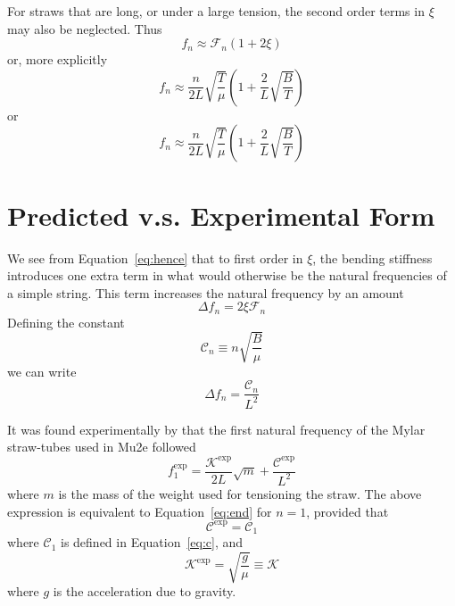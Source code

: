 \documentclass[twoside]{article}
\begin{document}
\begin{multicols}{2}
For straws that are long, or under a large tension, the second order terms in $\xi$ may also be neglected. Thus
 \begin{equation}
 \boxed{
 	f_n \approx \mathcal{F}_n (1 + 2\xi )
 }
 \end{equation}
 or, more explicitly 
  \begin{equation}
  f_n \approx  \frac{n}{2L}\sqrt{\frac{T}{\mu}}  (1 + \frac{2}{L}  \sqrt{\frac{B}{T}} )
 \label{eq:end}
  \end{equation}
or
  \begin{equation}
  f_n \approx  \frac{n}{2L}\sqrt{\frac{T}{\mu}}  (1 + \frac{2}{L}  \sqrt{\frac{B}{T}} )
  \end{equation}




\section{Predicted v.s. Experimental Form}
We see from Equation~\ref{eq:hence} that to first order in $\xi$, the bending stiffness introduces one extra term in what would otherwise be the natural frequencies of a simple string. This term increases the natural frequency by an amount
\begin{equation}
\Delta f_n =  2 \xi \mathcal{F}_n
\end{equation}
Defining the constant 
\begin{equation}
\mathcal{C}_n \equiv n \sqrt{\frac{B}{\mu}}
\label{eq:c}
\end{equation}
we can write
\begin{equation}
\Delta f_n =  \frac{\mathcal{C}_n}{L^2}
\end{equation}


It was found experimentally by \cite{david} that the first natural frequency of the Mylar straw-tubes used in Mu2e followed 
\begin{equation}
\boxed{
	f^\text{exp}_1 = \frac{\mathcal{K}^\text{exp}}{2L}\sqrt{m} + \frac{\mathcal{C}^\text{exp}}{L^2}
}
\end{equation}
where $m$ is the mass of the weight used for tensioning the straw.  The above expression is equivalent to Equation~\ref{eq:end} for $n=1$, provided that
\begin{equation}
	\mathcal{C}^\text{exp} = \mathcal{C}_1
\end{equation}
where $\mathcal{C}_1$ is defined in Equation~\ref{eq:c},
and 
\begin{equation}
\mathcal{K}^\text{exp} = \sqrt{\frac{g}{\mu}} \equiv \mathcal{K} 
\end{equation}
where $g$ is the acceleration due to gravity.






\end{multicols}
\end{document}
